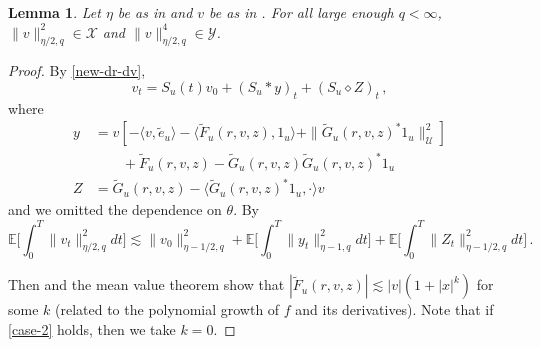 \documentclass[final]{amsart}
\newtheorem{lem}[thm]{Lemma}
\numberwithin{thm}{section}
\numberwithin{equation}{section}
\newcommand{\E}{\mathbb{E}}
\newcommand{\U}{\mathcal{U}}
\newcommand{\ip}[2]{\langle #1, #2 \rangle}
\newcommand{\X}{\mathcal{X}}
\newcommand{\Y}{\mathcal{Y}}
\begin{document}
\begin{lem}\label{v-sobolev}
Let $\eta$ be as in  and 
$v$ be as in .
    For all large enough $q < \infty$, $\|v\|_{\eta/2,q}^2 \in \X$ and $\|v\|_{\eta/2,q}^4 \in \Y$.
\end{lem}
\begin{proof}
    By \eqref{new-dr-dv},
    $$v_t = S_u(t)v_0 + (S_u * y)_t + (S_u \diamond Z)_t \,,$$
    where
    \begin{align*}
    y &= v[-\ip{v}{\tilde e_u} - \ip{\tilde F_u(r,v,z)}{1_u} + \|\tilde G_u(r,v,z)^*1_u\|_\U^2] \\
    &\qquad + \tilde F_u(r,v,z) - \tilde G_u(r,v,z)\tilde G_u(r,v,z)^*1_u \\
    Z &= \tilde G_u(r,v,z) - \ip{\tilde G_u(r,v,z)^*1_u}{\cdot}v
    \end{align*}
and we omitted the dependence on $\theta$. 
    By 
    \begin{equation}\label{eq:meotn}
    \E\Big[\int_0^T \|v_t\|_{\eta/2,q}^2dt\Big] \lesssim \|v_0\|^2_{\eta-1/2,q} + \E\Big[\int_0^T \|y_t\|^2_{\eta-1,q}dt\Big] + \E\Big[\int_0^T \|Z_t\|_{\eta-1/2,q}^2dt\Big] \,.
    \end{equation}
    



Then  and the mean value theorem show that $|\tilde F_u(r,v,z)| \lesssim |v|(1+|x|^k)$ for some $k$ (related to the polynomial growth of $f$ and its derivatives).
Note that if \ref{case-2} holds, then we take $k = 0$.



\end{proof}
\end{document}
